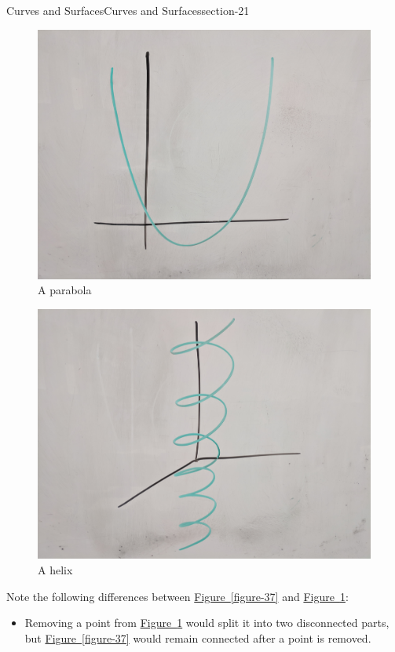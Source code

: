 \documentclass[oneside,10pt,]{article}
\begin{document}
\begin{sectionptx}{Curves and Surfaces}{}{Curves and Surfaces}{}{}{section-21}
\begin{figure}
\centering
\includegraphics[width=1\linewidth]{images/parabola.jpg}
\caption{A parabola\label{figure-40}}
\end{figure}
\begin{figure}
\centering
\includegraphics[width=1\linewidth]{images/helix.jpg}
\caption{A helix\label{figure-43}}
\end{figure}
\hypertarget{p-46}{}%
Note the following differences between \hyperref[figure-37]{Figure~\ref{figure-37}} and \hyperref[figure-40]{Figure~\ref{figure-40}}:%
\leavevmode%
\begin{itemize}[label=\textbullet]
\item{}Removing a point from \hyperref[figure-40]{Figure~\ref{figure-40}} would split it into two disconnected parts, but \hyperref[figure-37]{Figure~\ref{figure-37}} would remain connected after a point is removed.%

\end{itemize}
\end{sectionptx}
\end{document}
